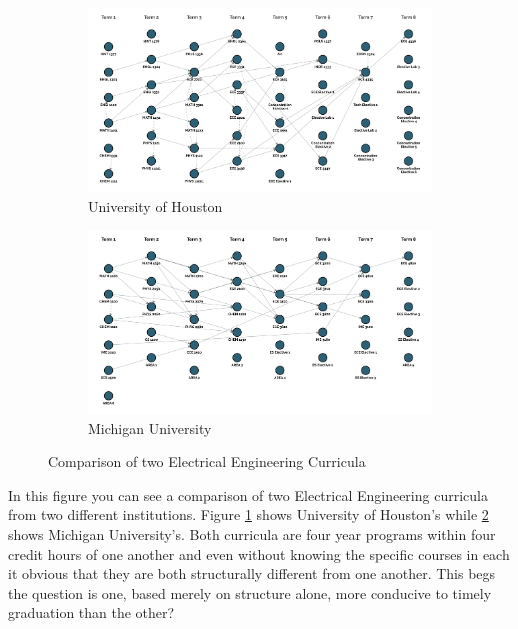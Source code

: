 \documentclass[botnum, fleqn]{unmeethesis}
\begin{document}
  \begin{figure}
    \centering
    \begin{subfigure}[h!]{.6\linewidth}
      \includegraphics[width=\linewidth]{./figures/UH.jpg}
      \caption{University of Houston}\label{fig:UH}
    \end{subfigure}

    \vspace{1cm}

    \begin{subfigure}[h!]{.6\linewidth}
      \includegraphics[width=\linewidth]{./figures/MU.jpg}
      \caption{Michigan University}\label{fig:MU}
    \end{subfigure}

    \caption{Comparison of two Electrical Engineering Curricula}
    \label{fig:comparison}
  \end{figure}

  In this figure you can see a comparison of two Electrical Engineering curricula from two different institutions. Figure \ref{fig:UH} shows University of Houston's while \ref{fig:MU} shows Michigan University's. Both curricula are four year programs within four credit hours of one another and even without knowing the specific courses in each it obvious that they are both structurally different from one another. This begs the question is one, based merely on structure alone, more conducive to timely graduation than the other?
\end{document}
